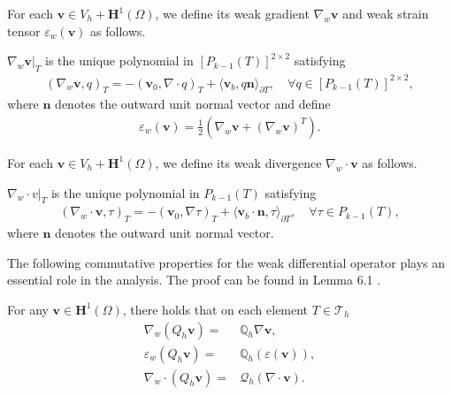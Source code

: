 \documentclass[leqno,CJK]{siamltex704}
\numberwithin{equation}{section}
\def\T{{\mathcal{T}}}
\def\Q{{\mathcal{Q}}}
\def\dQ{{\mathbb{Q}}}
\def\bv{{\mathbf{v}}}
\def\bh{{\mathbf{H}}}
\def\bn{{\mathbf{n}}}
\newcommand{\eps}{\varepsilon}
\begin{document}
For each $\bv\in V_h+\bh^1(\Omega)$, we define its weak gradient
$\nabla_w\bv$ and weak strain tensor $\eps_w(\bv)$ as follows.
\begin{definition}
	$\nabla_w\bv|_T$ is the unique polynomial in $[P_{k-1}(T)]^{2\times 2}$ satisfying
	\begin{eqnarray}\label{defw1}
		(\nabla_w\bv,q)_T=-(\bv_0,\nabla\cdot q)_T+\langle \bv_b,q\bn
		\rangle_{\partial T},\quad\forall q\in [P_{k-1}(T)]^{2\times 2},
	\end{eqnarray}
	where $\bn$ denotes the outward unit normal vector and define
	\begin{eqnarray}\label{defw2}
		\eps_w(\bv)=\frac{1}{2}(\nabla_w\bv+(\nabla_w\bv)^T).
	\end{eqnarray}
\end{definition}

For each $\bv\in V_h+\bh^1(\Omega)$, we define its weak divergence
$\nabla_w\cdot\bv$ as follows.
\begin{definition}
	$\nabla_w\cdot v|_T$ is the unique polynomial in $P_{k-1}(T)$ satisfying
	\begin{eqnarray}\label{defw3}
		(\nabla_w\cdot\bv,\tau)_T=-(\bv_0,\nabla\tau)_T+\langle \bv_b\cdot\bn,\tau
		\rangle_{\partial T},\quad\forall\tau\in P_{k-1}(T),
	\end{eqnarray}
	where $\bn$ denotes the outward unit normal vector.
\end{definition}

The following commutative properties for the weak differential operator
plays an essential role in the analysis. The proof can be found in Lemma 6.1 \cite{Wang2016c}.
\begin{lemma}\label{exchange}
	For any $\bv\in\bh^1(\Omega)$, there holds that on each element $T\in\T_h$
	\begin{align}
		\nabla_w (Q_h\bv) =& \dQ_h\nabla\bv,\label{exchange1}\\
		\eps_w (Q_h\bv) =& \dQ_h(\eps(\bv)),\label{exchange2}\\
		\nabla_w\cdot (Q_h\bv) =& \Q_h(\nabla\cdot\bv).\label{exchange3}
	\end{align}
\end{lemma}
\end{document}
